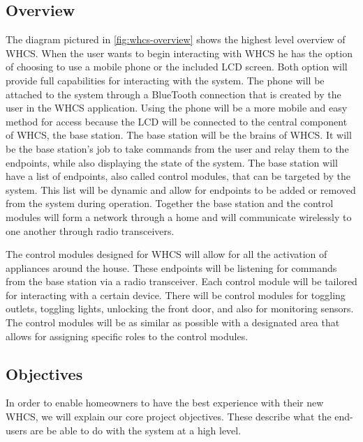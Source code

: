 \subsection{Overview}
The diagram pictured in \autoref{fig:whcs-overview} shows the highest level
overview of WHCS.  When the user wants to begin interacting with WHCS he has
the option of choosing to use a mobile phone or the included LCD screen. Both
option will provide full capabilities for interacting with the system. The
phone will be attached to the system through a BlueTooth connection that is
created by the user in the WHCS application. Using the phone will be a more
mobile and easy method for access because the LCD will be connected to the
central component of WHCS, the base station. The base station will be the
brains of WHCS. It will be the base station{}'s job to take commands from the
user and relay them to the endpoints, while also displaying the state of the
system. The base station will have a list of endpoints, also called control
modules, that can be targeted by the system. This list will be dynamic and
allow for endpoints to be added or removed from the system during operation.
Together the base station and the control modules will form a network through a
home and will communicate wirelessly to one another through radio transceivers.

The control modules designed for WHCS will allow for all the activation of
appliances around the house. These endpoints will be listening for commands
from the base station via a radio transceiver. Each control module will be
tailored for interacting with a certain device. There will be control modules
for toggling outlets, toggling lights, unlocking the front door, and also for
monitoring sensors. The control modules will be as similar as possible with a
designated area that allows for assigning specific roles to the control
modules.


\subsection{Objectives}
In order to enable homeowners to have the best experience with their new WHCS,
we will explain our core project objectives. These describe what the end-users
are be able to do with the system at a high level.

